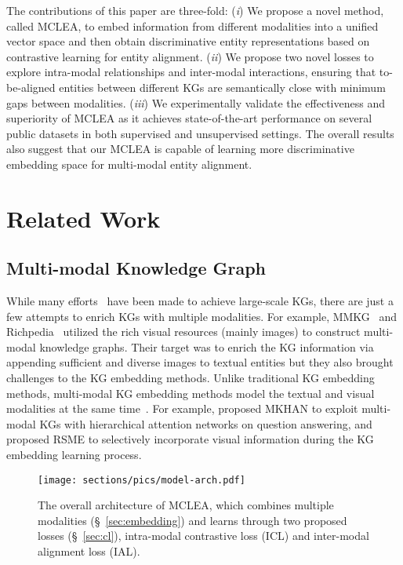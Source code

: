 \documentclass[11pt]{article}
\begin{document}
The contributions of this paper are three-fold: 
(\textit{i}) We propose a novel method, called MCLEA, to embed information from different modalities into a unified vector space and then obtain discriminative entity representations based on contrastive learning for entity alignment.
(\textit{ii}) We propose two novel losses to explore intra-modal relationships and inter-modal interactions, ensuring that to-be-aligned entities between different KGs are semantically close with minimum gaps between modalities.
(\textit{iii}) We experimentally validate the effectiveness and superiority of MCLEA as it achieves state-of-the-art performance on several public datasets in both supervised and unsupervised settings. The overall results also suggest that our MCLEA is capable of learning more discriminative embedding space for multi-modal entity alignment.
 
\section{Related Work}

\subsection{Multi-modal Knowledge Graph}

While many efforts~\cite{mahdisoltani2014yago3,lehmann2015dbpedia} have been made to achieve large-scale KGs, there are just a few attempts to enrich KGs with multiple modalities.
For example, MMKG~\cite{liu2019mmkg} and Richpedia~\cite{wang2020richpedia} utilized the rich visual resources (mainly images) to construct multi-modal knowledge graphs.
Their target was to enrich the KG information via appending sufficient and diverse images to textual entities but they also brought challenges to the KG embedding methods.
Unlike traditional KG embedding methods, multi-modal KG embedding methods model the textual and visual modalities at the same time~\cite{zhang2019multi,wang2021visual}.
For example, \citet{zhang2019multi} proposed MKHAN to exploit multi-modal KGs with hierarchical attention networks on question answering, and \citet{wang2021visual} proposed RSME to selectively incorporate visual information during the KG embedding learning process.


\begin{figure*}[!h]
    \centering
    \texttt{[image: sections/pics/model-arch.pdf]}
    \caption{The overall architecture of MCLEA, which combines multiple modalities (\S~\ref{sec:embedding}) and learns through two proposed losses (\S~\ref{sec:cl}), intra-modal contrastive loss (ICL) and inter-modal alignment loss (IAL).}
    \label{fig:model}
\end{figure*}
\end{document}
